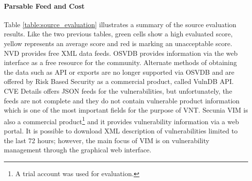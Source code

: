     
    
    
    
\paragraph{Parsable Feed and Cost}
Table \ref{table:source_evaluation} illustrates a summary of the source evaluation results. Like the two previous tables, green cells show a high evaluated score, yellow represents an average score and red is marking an unacceptable score. NVD provides free XML data feeds. OSVDB provides information via the web interface as a free resource for the community. Alternate methods of obtaining the data such as API or exports are no longer supported via OSVDB and are offered by Risk Based Security as a commercial product, called VulnDB API. CVE Details offers JSON feeds for the vulnerabilities, but unfortunately, the feeds are not complete and they do not contain vulnerable product information which is one of the most important fields for the purpose of VNT. Secunia VIM is also a commercial product\footnote{A trial account was used for evaluation.} and it provides vulnerability information via a web portal. It is possible to download XML description of vulnerabilities limited to the last 72 hours; however, the main focus of VIM is on vulnerability management through the graphical web interface. 
    
    
    
    
    
